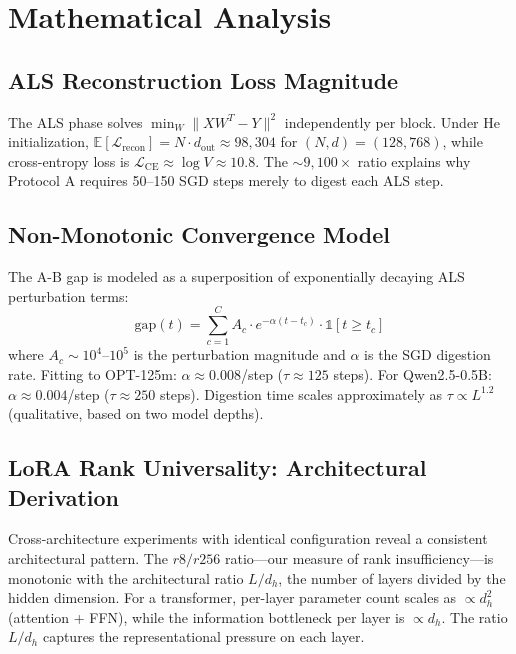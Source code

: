 \documentclass[11pt]{article}
\begin{document}
\section{Mathematical Analysis}

\subsection{ALS Reconstruction Loss Magnitude}

The ALS phase solves $\min_W \|X W^T - Y\|^2$ independently per block. Under He initialization, $\mathbb{E}[\mathcal{L}_{\text{recon}}] = N \cdot d_{\text{out}} \approx 98,304$ for $(N,d)=(128,768)$, while cross-entropy loss is $\mathcal{L}_{\text{CE}} \approx \log V \approx 10.8$. The $\sim 9,100\times$ ratio explains why Protocol A requires 50--150 SGD steps merely to digest each ALS step.

\subsection{Non-Monotonic Convergence Model}

The A-B gap is modeled as a superposition of exponentially decaying ALS perturbation terms:
\begin{equation}
\text{gap}(t) = \sum_{c=1}^{C} A_c \cdot e^{-\alpha (t - t_c)} \cdot \mathbb{1}[t \geq t_c]
\end{equation}
where $A_c \sim 10^4$--$10^5$ is the perturbation magnitude and $\alpha$ is the SGD digestion rate. Fitting to OPT-125m: $\alpha \approx 0.008$/step ($\tau \approx 125$ steps). For Qwen2.5-0.5B: $\alpha \approx 0.004$/step ($\tau \approx 250$ steps). Digestion time scales approximately as $\tau \propto L^{1.2}$ (qualitative, based on two model depths).

\subsection{LoRA Rank Universality: Architectural Derivation}

Cross-architecture experiments with identical configuration reveal a consistent architectural pattern. The $r8/r256$ ratio---our measure of rank insufficiency---is monotonic with the architectural ratio $L/d_h$, the number of layers divided by the hidden dimension. For a transformer, per-layer parameter count scales as $\propto d_h^2$ (attention + FFN), while the information bottleneck per layer is $\propto d_h$. The ratio $L/d_h$ captures the representational pressure on each layer.
\end{document}
